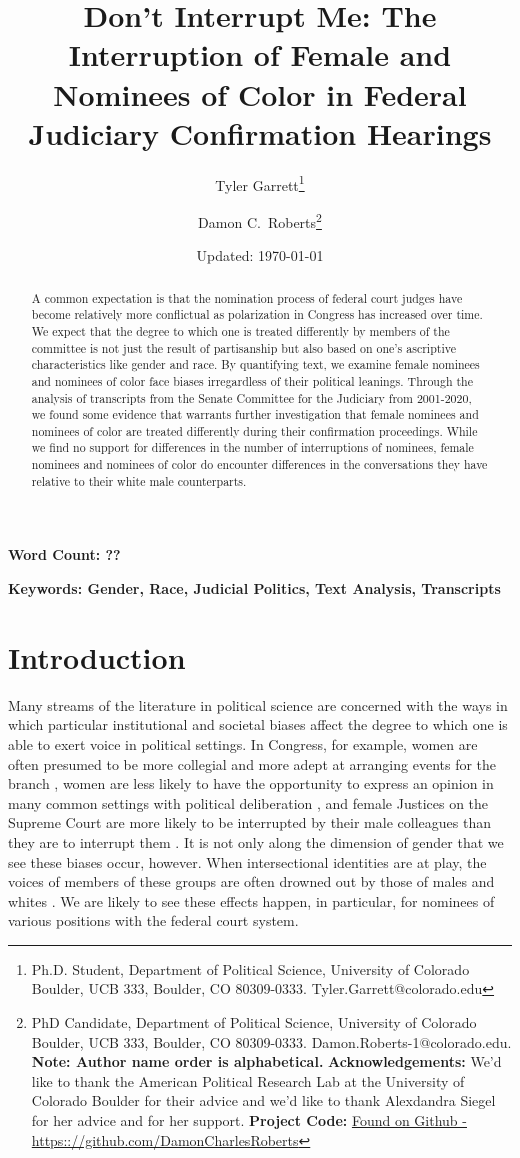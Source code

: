 \documentclass [12pt]{article}
\title{Don't Interrupt Me: The Interruption of Female and Nominees of Color in Federal Judiciary Confirmation Hearings}
\author{Tyler Garrett\footnote{Ph.D. Student, Department of Political Science, University of Colorado Boulder, UCB 333, Boulder, CO 80309-0333. Tyler.Garrett@colorado.edu} \and Damon C.\ Roberts\footnote{PhD Candidate,
		Department of Political Science, University of Colorado Boulder, UCB 333, Boulder, CO 80309-0333. Damon.Roberts-1@colorado.edu. \newline \textbf{Note: Author name order is alphabetical.} \newline \textbf{Acknowledgements:} We'd like to thank the American Political Research Lab at the University of Colorado Boulder for their advice and we'd like to thank Alexdandra Siegel for her advice and for her support. \newline \textbf{Project Code:} \href{https://github.com/DamonCharlesRoberts/judiciary_hearing_interruptions}{Found on Github - https:://github.com/DamonCharlesRoberts}}}
\date{Updated: \today}
\begin{document}
	\maketitle
	\begin{abstract}
A common expectation is that the nomination process of federal court judges have become relatively more conflictual as polarization in Congress has increased over time. We expect that the degree to which one is treated differently by members of the committee is not just the result of partisanship but also based on one's ascriptive characteristics like gender and race. By quantifying text, we examine female nominees and nominees of color face biases irregardless of their political leanings. Through the analysis of transcripts from the Senate Committee for the Judiciary from 2001-2020, we found some evidence that warrants further investigation that female nominees and nominees of color are treated differently during their confirmation proceedings. While we find no support for differences in the number of interruptions of nominees, female nominees and nominees of color do encounter differences in the conversations they have relative to their white male counterparts.
	\end{abstract}
	
	\textbf{Word Count: ??} 
	
	\textbf{Keywords: Gender, Race, Judicial Politics, Text Analysis, Transcripts}

	\cleardoublepage
    \setcounter{page}{2}
	\newpage
	\doublespace
	\newpage 

\section{Introduction}
	
Many streams of the literature in political science are concerned with the ways in which particular institutional and societal biases affect the degree to which one is able to exert voice in political settings. In Congress, for example, women are often presumed to be more collegial and more adept at arranging events for the branch \citep{lawless_2018}, women are less likely to have the opportunity to express an opinion in many common settings with political deliberation  \citep{karpowitz_et-al_2012}, and female Justices on the Supreme Court are more likely to be interrupted by their male colleagues than they are to interrupt them \citep{jacobi_2017}. It is not only along the dimension of gender that we see these biases occur, however. When intersectional identities are at play, the voices of members of these groups are often drowned out by those of males and whites \citep[see][for example]{strolovitch_2006}. We are likely to see these effects happen, in particular, for nominees of various positions with the federal court system. 
\end{document}
